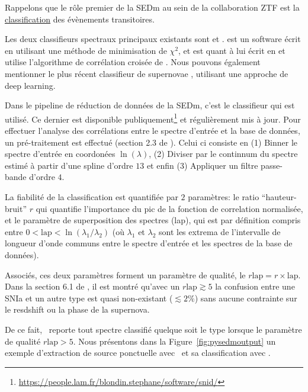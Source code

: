 \documentclass[../main/main.tex]{subfiles}
\begin{document}
Rappelons que le rôle premier de la SEDm au sein de la collaboration ZTF
est la \underline{classification} des évènements transitoires. 

Les deux classifieurs spectraux principaux existants sont 
\citep{HowellSuperfit} et  \citep{BlondinSNID}. 
est un software écrit en  utilisant une méthode de
minimisation de $\chi^{2}$, et  est quant à lui écrit
en  et utilise l'algorithme de corrélation croisée de \citet{TonryDavis}.
Nous pouvons également mentionner le plus récent classifieur de
supernovae  \citep{MuthukrishnaDash}, utilisant une approche de deep learning.

Dans le pipeline de réduction de données de la SEDm, c'est le
classifieur  qui est utilisé. Ce dernier est disponible publiquement\footnote{\url{https://people.lam.fr/blondin.stephane/software/snid/}} et
régulièrement mis à jour. Pour effectuer l'analyse des corrélations
entre le spectre d'entrée et la base de données, un pré-traitement est
effectué (section 2.3 de \citet{BlondinSNID}). Celui ci consiste en (1) Binner le spectre d'entrée en coordonées
$\ln(\lambda)$, (2) Diviser par le continnum du spectre estimé à partir
d'une spline d'ordre $13$ et enfin (3) Appliquer un filtre passe-bande d'ordre $4$.

La fiabilité de la classification est quantifiée par $2$ paramètres: le
ratio ``hauteur-bruit'' $r$ qui quantifie l'importance du pic de la
fonction de correlation normalisée, et le paramètre de superposition des
spectres (lap), qui est par définition compris entre
$0<\text{lap}<\ln(\lambda_{1}/\lambda_{2})$ (où $\lambda_{1}$ et $\lambda_{2}$
sont les extrema de l'intervalle de longueur d'onde communs entre le
spectre d'entrée et les spectres de la base de données).

Associés, ces deux paramètres forment un paramètre de qualité, le
$r\text{lap}=r\times\text{lap}$. Dans la section 6.1 de
\citet{BlondinSNID}, il est montré qu'avec un $r\text{lap}\gtrsim 5$
la confusion entre une SNIa et un autre type est quasi non-existant
($\lesssim2\%$) sans aucune contrainte sur le resdshift ou la phase de
la supernova.

De ce fait, \pysedm\ reporte tout spectre classifié quelque soit le type
lorsque le paramètre de qualité $r\text{lap}>5$. Nous présentons dans la
Figure~\ref{fig:pysedmoutput} un exemple d'extraction de source
ponctuelle avec \pysedm\ et sa classification avec .
\end{document}
